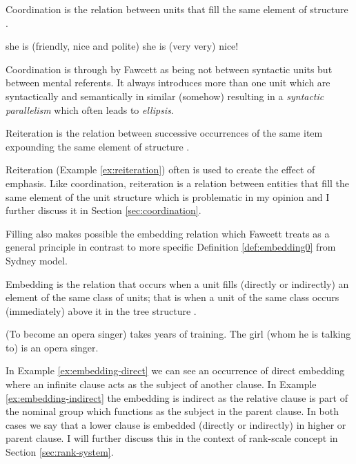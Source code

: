 \begin{definition}[Coordination]\label{def:coordination}
    Coordination is the relation between units that fill the same element of structure \citep[263]{Fawcett2000}. 
\end{definition}

\begin{exe}
    \ex\label{ex:coordination} she is (friendly, nice and polite)
    \ex\label{ex:reiteration} she is (very very) nice!
\end{exe}

Coordination is through by Fawcett as being not between syntactic units but between mental referents. It always introduces more than one unit which are syntactically and semantically in similar (somehow) resulting in a \textit{syntactic parallelism} which often leads to \textit{ellipsis}. 

\begin{definition}[Reiteration]\label{def:reiteration}
    Reiteration is the relation between successive occurrences of the same item expounding the same element of structure  \citep[271]{Fawcett2000}. 
\end{definition}

Reiteration (Example \ref{ex:reiteration}) often is used to create the effect of emphasis. Like coordination, reiteration is a relation between entities that fill the same element of the unit structure which is problematic in my opinion and I further discuss it in Section \ref{sec:coordination}.

Filling also makes possible the embedding relation  which Fawcett treats as a general principle in contrast to more specific Definition \ref{def:embedding0} from Sydney model.

\begin{definition}\label{def:embedding}
    Embedding is the relation that occurs when a unit fills (directly or indirectly) an element of the same class of units; that is when a unit of the same class occurs (immediately) above it in the tree structure \citep[264]{Fawcett2000}. 
\end{definition}

\begin{exe}
    \ex\label{ex:embedding-direct} (To become an opera singer) takes years of training.
    \ex\label{ex:embedding-indirect} The girl (whom he is talking to) is an opera singer.
\end{exe}

In Example \ref{ex:embedding-direct} we can see an occurrence of direct embedding where an infinite clause acts as the subject of another clause. In Example \ref{ex:embedding-indirect} the embedding is indirect as the relative clause is part of the nominal group which functions as the subject in the parent clause. In both cases we say that a lower clause is embedded (directly or indirectly) in higher or parent clause. I will further discuss this in the context of rank-scale concept in Section \ref{sec:rank-system}.

